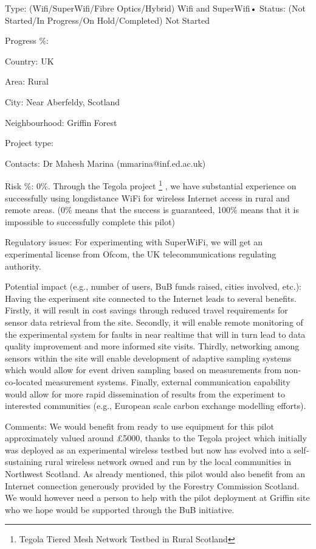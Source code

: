 \documentclass[draftclsnofoot,12pt,journal,onecolumn]{IEEEtran}
\begin{document}
Type: (Wifi/SuperWifi/Fibre Optics/Hybrid) Wifi and SuperWifi• Status: (Not Started/In Progress/On Hold/Completed) Not Started

Progress \%:

Country: UK

Area: Rural

City: Near Aberfeldy, Scotland

Neighbourhood: Griffin Forest

Project type:

Contacts: Dr Mahesh Marina (mmarina@inf.ed.ac.uk)

Risk \%: 0\%. Through the Tegola project \footnote{Tegola Tiered Mesh Network Testbed in Rural Scotland} , we have substantial experience on successfully
using long­distance WiFi for wireless Internet access in rural and remote areas.
(0\% means that the success is guaranteed, 100\% means that it is
impossible to successfully complete this pilot)

Regulatory issues: For experimenting with SuperWiFi, we will get an experimental license from
Ofcom, the UK telecommunications regulating authority.

Potential impact (e.g., number of users, BuB funds raised, cities
involved, etc.):
Having the experiment site connected to the Internet leads to several benefits. Firstly, it will result
in cost savings through reduced travel requirements for sensor data retrieval from the site.
Secondly, it will enable remote monitoring of the experimental system for faults in near real­time
that will in turn lead to data quality improvement and more informed site visits. Thirdly,
networking among sensors within the site will enable development of adaptive sampling systems
which would allow for event driven sampling based on measurements from non‐co‐located
measurement systems. Finally, external communication capability would allow for more rapid
dissemination of results from the experiment to interested communities (e.g., European scale
carbon exchange modelling efforts).

Comments:
We would benefit from ready to use equipment for this pilot approximately valued around £5000,
thanks to the Tegola project which initially was deployed as an experimental wireless testbed but
now has evolved into a self­sustaining rural wireless network owned and run by the local
communities in Northwest Scotland. As already mentioned, this pilot would also benefit from an
Internet connection generously provided by the Forestry Commission Scotland. We would
however need a person to help with the pilot deployment at Griffin site who we hope would be
supported through the BuB initiative.
\end{document}
